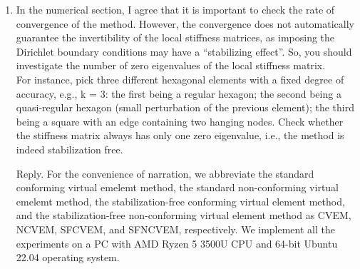 \documentclass[10pt]{amsart}
\theoremstyle{definition}
\theoremstyle{remark}
\begin{document}
\begin{enumerate}[1.]
\medskip

\item \textsf{In the numerical section, I agree that it is important to check the rate of convergence of the method.
However, the convergence does not automatically guarantee the invertibility of the local stiffness matrices, as imposing the Dirichlet boundary conditions may have a “stabilizing effect”. So, you should investigate the number of zero eigenvalues of the local stiffness matrix.\\
For instance, pick three different hexagonal elements with a fixed degree of accuracy, e.g., k = 3: the first being a regular hexagon; the second being a quasi-regular hexagon (small perturbation of the previous element); the third being a square with an edge containing two hanging nodes. Check whether the stiffness matrix always has only one zero eigenvalue, i.e., the method is indeed stabilization free.}

\smallskip \noindent \textcolor[rgb]{1.00,0.00,0.00}{Reply.}
For the convenience of narration, we abbreviate the standard conforming virtual emelemt
method, the standard non-conforming virtual emelemt method, 
the stabilization-free conforming virtual element method,
and the stabilization-free non-conforming virtual element method as CVEM, NCVEM, SFCVEM, and SFNCVEM, respectively. 
We implement all the experiments on a PC with AMD Ryzen
5 3500U CPU and 64-bit Ubuntu 22.04 operating system.


\end{enumerate}
\end{document}
